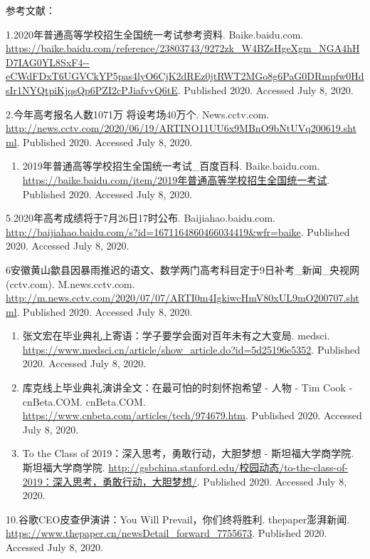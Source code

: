 \documentclass[]{article}
\providecommand{\tightlist}{%
  \setlength{\itemsep}{0pt}\setlength{\parskip}{0pt}}
\begin{document}
\Large 参考文献：

1.2020年普通高等学校招生全国统一考试参考资料. Baike.baidu.com.
\url{https://baike.baidu.com/reference/23803743/9272zk_W4BZsHgeXgm_NGA4hHD7IAG0YL8SxF4--eCWdFDxT6UGVCkYP5pas4lyO6CjK2dREz0jtRWT2MGo8g6PaG0DRmpfw0HdsIr1NYQtpiKjqsQp6PZI2cPJiafvvQ6tE}.
Published 2020. Accessed July 8, 2020.

2.今年高考报名人数1071万 将设考场40万个. News.cctv.com.
\url{http://news.cctv.com/2020/06/19/ARTINO11UU6x9MBnO9bNtUVq200619.shtml}.
Published 2020. Accessed July 8, 2020.

\begin{enumerate}
\def\labelenumi{\arabic{enumi}.}
\setcounter{enumi}{2}
\tightlist
\item
  2019年普通高等学校招生全国统一考试\_百度百科. Baike.baidu.com.
  \url{https://baike.baidu.com/item/2019年普通高等学校招生全国统一考试}.
  Published 2020. Accessed July 8, 2020.
\end{enumerate}

5.2020年高考成绩将于7月26日17时公布. Baijiahao.baidu.com.
\url{http://baijiahao.baidu.com/s?id=1671164860466034419\&wfr=baike}.
Published 2020. Accessed July 8, 2020.

6安徽黄山歙县因暴雨推迟的语文、数学两门高考科目定于9日补考\_新闻\_央视网(cctv.com).
M.news.cctv.com.
\url{http://m.news.cctv.com/2020/07/07/ARTI0m4IgkiwcHmV80xUL9mO200707.shtml}.
Published 2020. Accessed July 8, 2020.

\begin{enumerate}
\def\labelenumi{\arabic{enumi}.}
\setcounter{enumi}{6}
\item
  张文宏在毕业典礼上寄语：学子要学会面对百年未有之大变局. medsci.
  \url{https://www.medsci.cn/article/show_article.do?id=5d25196e5352}.
  Published 2020. Accessed July 8, 2020.
\item
  库克线上毕业典礼演讲全文：在最可怕的时刻怀抱希望 - 人物 - Tim Cook -
  cnBeta.COM. cnBeta.COM.
  \url{https://www.cnbeta.com/articles/tech/974679.htm}. Published 2020.
  Accessed July 8, 2020.
\item
  To the Class of 2019：深入思考，勇敢行动，大胆梦想 - 斯坦福大学商学院.
  斯坦福大学商学院.
  \url{http://gsbchina.stanford.edu/校园动态/to-the-class-of-2019：深入思考，勇敢行动，大胆梦想/}.
  Published 2020. Accessed July 8, 2020.
\end{enumerate}

10.谷歌CEO皮查伊演讲：You Will Prevail，你们终将胜利. thepaper澎湃新闻.
\url{https://www.thepaper.cn/newsDetail_forward_7755673}. Published
2020. Accessed July 8, 2020.
\end{document}
